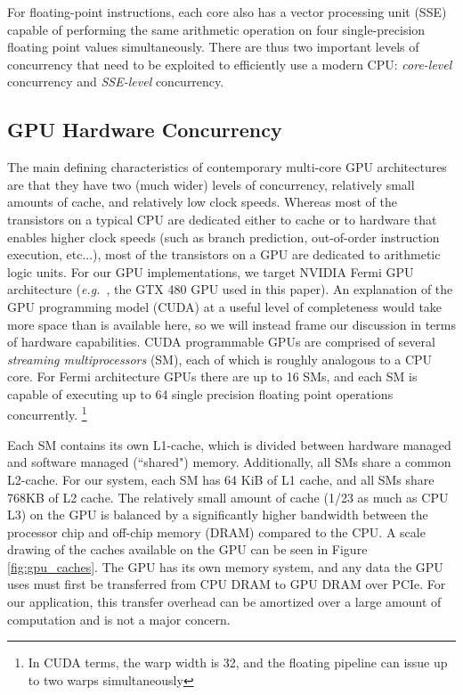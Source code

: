 \documentclass[preprint]{sigplanconf}
\def\eg{\emph{e.g.\ }}
\begin{document}
For floating-point instructions, each core also has a vector processing unit
(SSE) capable of performing the same arithmetic operation on four single-precision 
floating point values simultaneously.
There are thus two important levels of concurrency that need to be exploited to
efficiently use a modern CPU: {\em core-level} concurrency and {\em SSE-level}
concurrency. 

\subsection{GPU Hardware Concurrency} 
The main defining characteristics of contemporary multi-core GPU architectures
are that they have two (much wider) levels of concurrency, relatively small amounts of
 cache, and relatively low clock speeds.  Whereas most of the transistors on
a typical CPU are dedicated either to cache or to hardware that enables higher
clock speeds (such as branch prediction, out-of-order instruction execution, etc...),
most of the transistors on a GPU are dedicated to arithmetic logic units.
For our GPU implementations, we target NVIDIA Fermi GPU architecture (\eg, the GTX 480
GPU used in this paper).  An explanation of the GPU programming model (CUDA) at a useful level of completeness would take more space than is available here, so we will instead frame our discussion in terms of 
hardware capabilities. 
CUDA programmable GPUs are comprised of several
\emph{streaming multiprocessors} (SM), each of which is roughly analogous to a CPU core.
For Fermi architecture GPUs there are up to 16 SMs, and each SM is capable of executing up to 64 single precision 
floating point operations
concurrently. \footnote{In CUDA terms, the warp width is 32, and the floating pipeline can
issue up to two warps simultaneously}

Each SM contains its own L1-cache, which is divided between hardware managed
and software managed (``shared") memory.  Additionally, all SMs share a common
L2-cache.  For our system, each SM has 64 KiB of L1 cache, and all SMs share
768KB of L2 cache. 
The relatively small amount
of cache (1/23 as much as CPU L3) on the GPU is balanced by a significantly
higher bandwidth between the processor chip and off-chip memory (DRAM) compared
to the CPU.  A scale drawing of the caches available on the GPU can be seen in Figure \ref{fig:gpu_caches}.
The GPU has its own memory system, and any data the GPU uses must first be
transferred from CPU DRAM to GPU DRAM over PCIe.  For our application,
this transfer overhead can be amortized over a large amount of computation and is
not a major concern.
\end{document}

